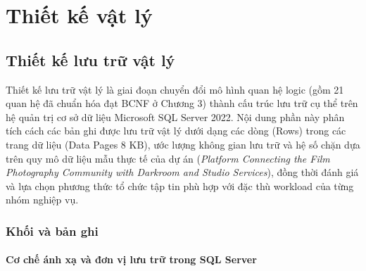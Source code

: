 \chapter{Thiết kế vật lý}

\section{Thiết kế lưu trữ vật lý}

Thiết kế lưu trữ vật lý là giai đoạn chuyển đổi mô hình quan hệ logic (gồm 21 quan hệ đã chuẩn hóa đạt BCNF ở Chương 3) thành cấu trúc lưu trữ cụ thể trên hệ quản trị cơ sở dữ liệu Microsoft SQL Server 2022. Nội dung phần này phân tích cách các bản ghi được lưu trữ vật lý dưới dạng các dòng (Rows) trong các trang dữ liệu (Data Pages $8\text{ KB}$), ước lượng không gian lưu trữ và hệ số chặn dựa trên quy mô dữ liệu mẫu thực tế của dự án (\textit{Platform Connecting the Film Photography Community with Darkroom and Studio Services}), đồng thời đánh giá và lựa chọn phương thức tổ chức tập tin phù hợp với đặc thù workload của từng nhóm nghiệp vụ.

\subsection{Khối và bản ghi}

\subsubsection{Cơ chế ánh xạ và đơn vị lưu trữ trong SQL Server}

